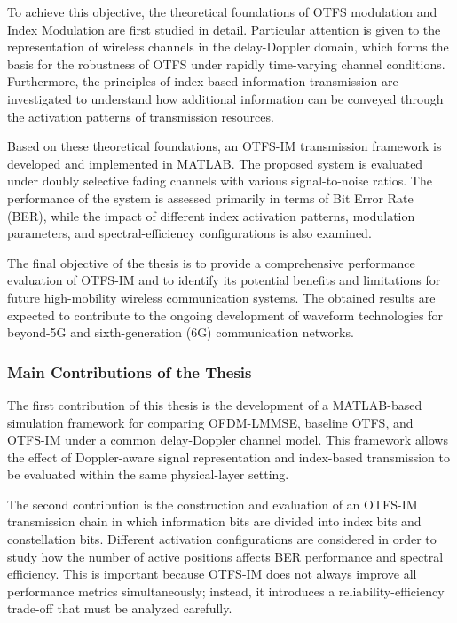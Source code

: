 To achieve this objective, the theoretical foundations of OTFS modulation and Index Modulation are first studied in detail. Particular attention is given to the representation of wireless channels in the delay-Doppler domain, which forms the basis for the robustness of OTFS under rapidly time-varying channel conditions. Furthermore, the principles of index-based information transmission are investigated to understand how additional information can be conveyed through the activation patterns of transmission resources.

Based on these theoretical foundations, an OTFS-IM transmission framework is developed and implemented in MATLAB. The proposed system is evaluated under doubly selective fading channels with various signal-to-noise ratios. The performance of the system is assessed primarily in terms of Bit Error Rate (BER), while the impact of different index activation patterns, modulation parameters, and spectral-efficiency configurations is also examined.

The final objective of the thesis is to provide a comprehensive performance evaluation of OTFS-IM and to identify its potential benefits and limitations for future high-mobility wireless communication systems. The obtained results are expected to contribute to the ongoing development of waveform technologies for beyond-5G and sixth-generation (6G) communication networks.

\subsubsection{Main Contributions of the Thesis}

The first contribution of this thesis is the development of a MATLAB-based simulation framework for comparing OFDM-LMMSE, baseline OTFS, and OTFS-IM under a common delay-Doppler channel model. This framework allows the effect of Doppler-aware signal representation and index-based transmission to be evaluated within the same physical-layer setting.

The second contribution is the construction and evaluation of an OTFS-IM transmission chain in which information bits are divided into index bits and constellation bits. Different activation configurations are considered in order to study how the number of active positions affects BER performance and spectral efficiency. This is important because OTFS-IM does not always improve all performance metrics simultaneously; instead, it introduces a reliability-efficiency trade-off that must be analyzed carefully.

